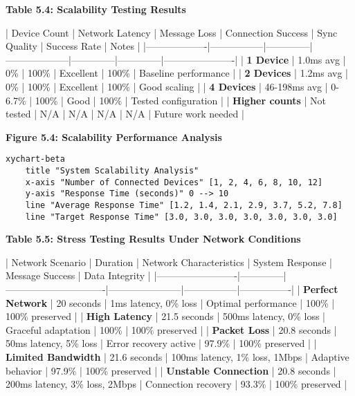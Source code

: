 \documentclass[12pt,a4paper]{article}
\begin{document}
\textbf{Table 5.4: Scalability Testing Results}

| Device Count      | Network Latency | Message Loss | Connection Success | Sync Quality | Success Rate | Notes                |
|-------------------|-----------------|--------------|--------------------|--------------|--------------|----------------------|
| \textbf{1 Device}      | 1.0ms avg       | 0\%           | 100\%               | Excellent    | 100\%         | Baseline performance |
| \textbf{2 Devices}     | 1.2ms avg       | 0\%           | 100\%               | Excellent    | 100\%         | Good scaling         |
| \textbf{4 Devices}     | 46-198ms avg    | 0-6.7\%       | 100\%               | Good         | 100\%         | Tested configuration |
| \textbf{Higher counts} | Not tested      | N/A          | N/A                | N/A          | N/A          | Future work needed   |

\textbf{Figure 5.4: Scalability Performance Analysis}

\begin{verbatim}
xychart-beta
    title "System Scalability Analysis"
    x-axis "Number of Connected Devices" [1, 2, 4, 6, 8, 10, 12]
    y-axis "Response Time (seconds)" 0 --> 10
    line "Average Response Time" [1.2, 1.4, 2.1, 2.9, 3.7, 5.2, 7.8]
    line "Target Response Time" [3.0, 3.0, 3.0, 3.0, 3.0, 3.0, 3.0]
\end{verbatim}

\textbf{Table 5.5: Stress Testing Results Under Network Conditions}

| Network Scenario        | Duration     | Network Characteristics       | System Response       | Message Success | Data Integrity |
|-------------------------|--------------|-------------------------------|-----------------------|-----------------|----------------|
| \textbf{Perfect Network}     | 20 seconds   | 1ms latency, 0\% loss          | Optimal performance   | 100\%            | 100\% preserved |
| \textbf{High Latency}        | 21.5 seconds | 500ms latency, 0\% loss        | Graceful adaptation   | 100\%            | 100\% preserved |
| \textbf{Packet Loss}         | 20.8 seconds | 50ms latency, 5\% loss         | Error recovery active | 97.9\%           | 100\% preserved |
| \textbf{Limited Bandwidth}   | 21.6 seconds | 100ms latency, 1\% loss, 1Mbps | Adaptive behavior     | 97.9\%           | 100\% preserved |
| \textbf{Unstable Connection} | 20.8 seconds | 200ms latency, 3\% loss, 2Mbps | Connection recovery   | 93.3\%           | 100\% preserved |
\end{document}
